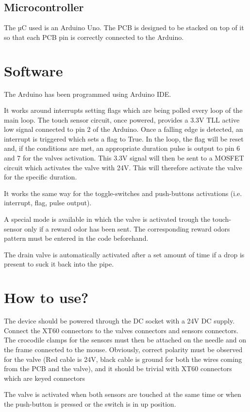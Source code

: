 \documentclass[a4paper]{article}
\begin{document}
\subsection{Microcontroller}
The µC used is an Arduino Uno. The PCB is designed to be stacked on top of it so that each PCB pin is correctly connected to the Arduino. 

\section{Software}
The Arduino has been programmed using Arduino IDE. 

It works around interrupts setting flags which are being polled every loop of the main loop.
The touch sensor circuit, once powered, provides a 3.3V TLL active low signal connected to pin 2 of the Arduino. Once a falling edge is detected, an interrupt is triggered which sets a flag to True. In the loop, the flag will be reset and, if the conditions are met, an appropriate duration pulse is output to pin 6 and 7 for the valves activation. This 3.3V signal will then be sent to a MOSFET circuit which activates the valve with 24V. This will therefore activate the valve for the specific duration.

It works the same way for the toggle-switches and push-buttons activations (i.e. interrupt, flag, pulse output).

A special mode is available in which the valve is activated trough the touch-sensor only if a reward odor has been sent. The corresponding reward odors pattern must be entered in the code beforehand. 

The drain valve is automatically activated after a set amount of time if a drop is present to suck it back into the pipe.

\section{How to use?}
The device should be powered through the DC socket with a 24V DC supply.
Connect the XT60 connectors to the valves connectors and sensors connectors. The crocodile clamps for the sensors must then be attached on the needle and on the frame connected to the mouse. Obviously, correct polarity must be observed for the valve (Red cable is 24V, black cable is ground for both the wires coming from the PCB and the valve), and it should be trivial with XT60 connectors which are keyed connectors

The valve is activated when both sensors are touched at the same time or when the push-button is pressed or the switch is in up position.
\end{document}
